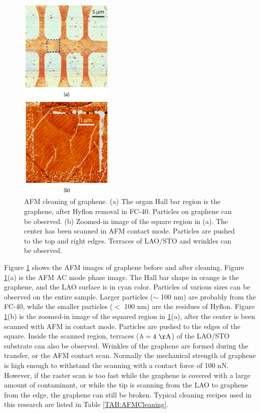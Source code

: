 \documentclass[pdflatex, sectionletters, 12pt, final, phd]{pittetd}    %
\begin{document}
\begin{figure}[p]
	\centering
	\includegraphics[width=0.4\textwidth]{Drawing/GrapheneAC.pdf}
	\caption[AFM cleaning of graphene]{AFM cleaning of graphene. (a) The organ Hall bar region is the graphene, after Hyflon removal in FC-40. Particles on graphene can be observed. (b) Zoomed-in image of the square region in (a). The center has been scanned in AFM contact mode. Particles are pushed to the top and right edges. Terraces of LAO/STO and wrinkles can be observed.}
	\label{FIG:GrapheneAC}
\end{figure}

Figure \ref{FIG:GrapheneAC} shows the AFM images of graphene before and after cleaning. Figure \ref{FIG:GrapheneAC}(a) is the AFM AC mode phase image. The Hall bar shape in orange is the graphene, and the LAO surface is in cyan color. Particles of various sizes can be observed on the entire sample. Larger particles ($\sim$ 100 nm) are probably from the FC-40, while the smaller particles ($<$ 100 nm) are the residues of Hyflon. Figure \ref{FIG:GrapheneAC}(b) is the zoomed-in image of the squared region in \ref{FIG:GrapheneAC}(a), after the center is been scanned with AFM in contact mode. Particles are pushed to the edges of the square. Inside the scanned region, terraces ($h = 4 \ \mathrm{\AA}$) of the LAO/STO substrate can also be observed. Wrinkles of the graphene are formed during the transfer, or the AFM contact scan. Normally the mechanical strength of graphene is high enough\cite{lee2008measurement} to withstand the scanning with a contact force of 100 nN. However, if the raster scan is too fast while the graphene is covered with a large amount of contaminant, or while the tip is scanning from the LAO to graphene from the edge, the graphene can still be broken. Typical cleaning recipes used in this research are listed in Table \ref{TAB:AFMCleaning}.
\end{document}
